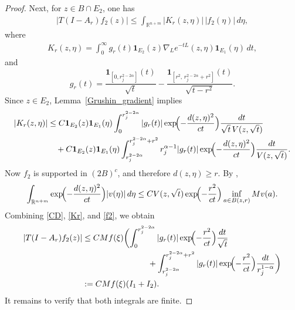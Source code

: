 \documentclass[12pt]{amsart}
\begin{document}
\begin{proof}
Next, for $z\in B \cap E_2$, one has
\begin{align}\label{f2}
    |T(I-A_r)f_2(z)|\le \int_{\mathbb{R}^{n+m}} |K_r(z,\eta)| \, |f_2(\eta)| \, d\eta,
\end{align}
where
\begin{align*}
    K_r(z,\eta) = \int_0^\infty g_r(t) \mathbf{1}_{E_2}(z) \nabla_L e^{-tL}(z,\eta) \mathbf{1}_{E_1}(\eta) \, dt,
\end{align*}
and
\begin{equation*}
    g_r(t) = \frac{\mathbf{1}_{[0,r_j^{2-2\alpha}]}(t)}{\sqrt{t}} - \frac{\mathbf{1}_{[r^2,\, r_j^{2-2\alpha}+r^2]}(t)}{\sqrt{t-r^2}}.
\end{equation*}
Since $z\in E_2$, Lemma~\ref{Grushin_gradient} implies
\begin{align}\label{Kr}
    |K_r(z,\eta)|
    &\le C \mathbf{1}_{E_2}(z) \mathbf{1}_{E_1}(\eta) \int_0^{r_j^{2-2\alpha}} |g_r(t)| \exp\!\Bigl( - \frac{d(z,\eta)^2}{c t} \Bigr) \frac{dt}{\sqrt{t} \, V(z,\sqrt{t})}\nonumber\\
    &\quad + C \mathbf{1}_{E_2}(z) \mathbf{1}_{E_1}(\eta) \int_{r_j^{2-2\alpha}}^{r_j^{2-2\alpha}+r^2} r_j^{\alpha-1} |g_r(t)| \exp\!\Bigl(-\frac{d(z,\eta)^2}{c t}\Bigr) \frac{dt}{V(z,\sqrt{t})}.
\end{align}
Now $f_2$ is supported in $(2B)^c$, and therefore $d(z,\eta)\ge r$. By \cite[Lemma~3.1]{CD},
\begin{equation}\label{CD}
    \int_{\mathbb{R}^{n+m}} \exp\!\Bigl( - \frac{d(z,\eta)^2}{c t} \Bigr) |v(\eta)| \, d\eta \le C V(z,\sqrt{t}) \exp\!\Bigl( -\frac{r^2}{c t} \Bigr) \inf_{a\in B(z,r)} Mv(a).
\end{equation}
Combining \eqref{CD}, \eqref{Kr}, and \eqref{f2}, we obtain
\begin{align*}
    |T(I-A_r)f_2(z)|
    &\le C Mf(\xi) \biggl( \int_0^{r_j^{2-2\alpha}} |g_r(t)| \exp\!\Bigl(-\frac{r^2}{c t}\Bigr) \frac{dt}{\sqrt{t}} \\
    &\qquad\qquad\qquad\qquad + \int_{r_j^{2-2\alpha}}^{r_j^{2-2\alpha}+r^2} |g_r(t)| \exp\!\Bigl(-\frac{r^2}{c t}\Bigr) \frac{dt}{r_j^{1-\alpha}} \biggr)\\
    &:= C Mf(\xi) (I_1+I_2).
\end{align*}
It remains to verify that both integrals are finite.


\end{proof}
\end{document}
